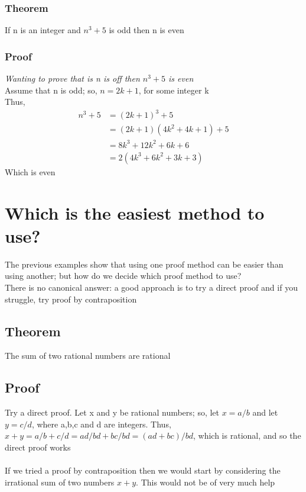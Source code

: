 \documentclass{article}[18pt]
\begin{document}
\subsubsection{Theorem}
If n is an integer and $n^3+5$ is odd then n is even
\subsubsection{Proof}
\textit{Wanting to prove that is n is off then $n^3+5$ is even}\\
Assume that n is odd; so, $n=2k+1$, for some integer k\\
Thus,
$$
\begin{aligned} n^{3}+5 &=(2 k+1)^{3}+5 \\ &=(2 k+1)\left(4 k^{2}+4 k+1\right)+5 \\ &=8 k^{3}+12 k^{2}+6 k+6 \\ &=2\left(4 k^{3}+6 k^{2}+3 k+3\right) \end{aligned}
$$
Which is even
\section{Which is the easiest method to use?}
The previous examples show that using one proof method can be easier than using another; but how do we decide which proof method to use?\\
There is no canonical answer: a good approach is to try a direct proof and if you struggle, try proof by contraposition
\subsection{Theorem}
The sum of two rational numbers are rational
\subsection{Proof}
Try a direct proof. Let x and y be rational numbers; so, let $x=a/b$ and let $y=c/d$, where a,b,c and d are integers. Thus, $x+y=a / b+c / d=a d / b d+b c / b d=(a d+b c) / b d$, which is rational, and so the direct proof works\\
\\
If we tried a proof by contraposition then we would start by considering the irrational sum of two numbers $x+y$. This would not be of very much help
\end{document}
